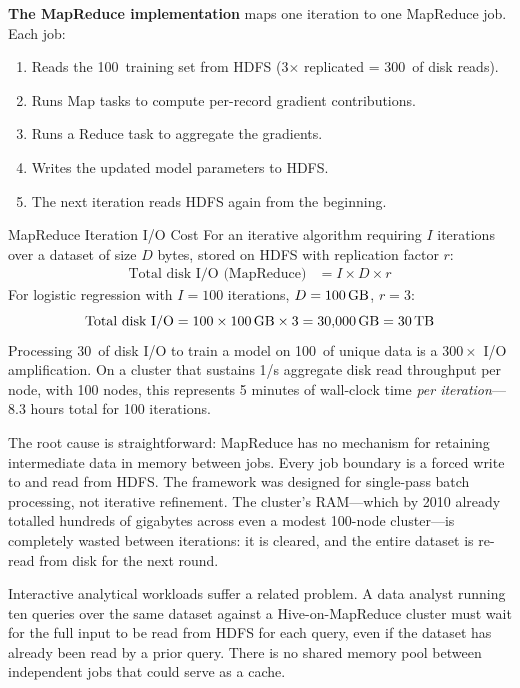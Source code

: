 \textbf{The MapReduce implementation} maps one iteration to one
MapReduce job. Each job:
\begin{enumerate}
  \item Reads the 100\GB\ training set from HDFS (3$\times$ replicated
        = 300\GB\ of disk reads).
  \item Runs Map tasks to compute per-record gradient contributions.
  \item Runs a Reduce task to aggregate the gradients.
  \item Writes the updated model parameters to HDFS.
  \item The next iteration reads HDFS again from the beginning.
\end{enumerate}

\begin{defbox}{MapReduce Iteration I/O Cost}
For an iterative algorithm requiring $I$ iterations over a dataset of
size $D$ bytes, stored on HDFS with replication factor $r$:
\begin{align}
\text{Total disk I/O (MapReduce)} &= I \times D \times r
  \label{eq:mr-io-cost}
\end{align}
For logistic regression with $I = 100$ iterations, $D = 100\,\text{GB}$,
$r = 3$:
\[
  \text{Total disk I/O} = 100 \times 100\,\text{GB} \times 3 = 30{,}000\,\text{GB} = 30\,\text{TB}
\]
Processing 30\TB\ of disk I/O to train a model on 100\GB\ of unique data
is a $300\times$ I/O amplification. On a cluster that sustains 1\GB/s
aggregate disk read throughput per node, with 100 nodes, this represents
5 minutes of wall-clock time \emph{per iteration}---8.3 hours total for
100 iterations.
\end{defbox}

The root cause is straightforward: MapReduce has no mechanism for retaining
intermediate data in memory between jobs. Every job boundary is a forced
write to and read from HDFS. The framework was designed for single-pass
batch processing, not iterative refinement. The cluster's RAM---which by
2010 already totalled hundreds of gigabytes across even a modest 100-node
cluster---is completely wasted between iterations: it is cleared, and the
entire dataset is re-read from disk for the next round.

Interactive analytical workloads suffer a related problem. A data
analyst running ten queries over the same dataset against a Hive-on-MapReduce
cluster must wait for the full input to be read from HDFS for each query,
even if the dataset has already been read by a prior query. There is no
shared memory pool between independent jobs that could serve as a cache.

